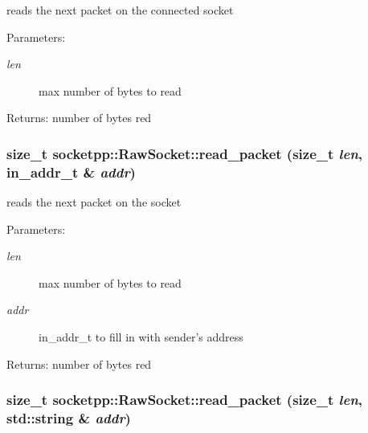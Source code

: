 reads the next packet on the connected socket 

\begin{Desc}
\item[Parameters:]
\begin{description}
\item[{\em len}]max number of bytes to read \end{description}
\end{Desc}
\begin{Desc}
\item[Returns:]number of bytes red \end{Desc}
\hypertarget{classsocketpp_1_1RawSocket_08b8bec945928764f2d7ee11890b8625}{
\subsubsection[{read\_\-packet}]{\setlength{\rightskip}{0pt plus 5cm}size\_\-t socketpp::RawSocket::read\_\-packet (size\_\-t {\em len}, \/  in\_\-addr\_\-t \& {\em addr})}}
\label{classsocketpp_1_1RawSocket_08b8bec945928764f2d7ee11890b8625}


reads the next packet on the socket 

\begin{Desc}
\item[Parameters:]
\begin{description}
\item[{\em len}]max number of bytes to read \item[{\em addr}]in\_\-addr\_\-t to fill in with sender's address \end{description}
\end{Desc}
\begin{Desc}
\item[Returns:]number of bytes red \end{Desc}
\hypertarget{classsocketpp_1_1RawSocket_1564181b6422fb3918c419051b34ae2d}{
\subsubsection[{read\_\-packet}]{\setlength{\rightskip}{0pt plus 5cm}size\_\-t socketpp::RawSocket::read\_\-packet (size\_\-t {\em len}, \/  std::string \& {\em addr})}}
\label{classsocketpp_1_1RawSocket_1564181b6422fb3918c419051b34ae2d}


